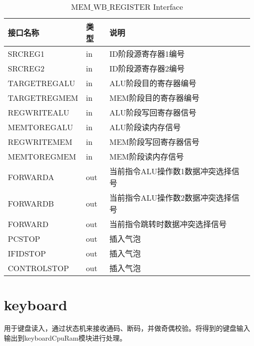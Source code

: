 \begin{table}[H]
\begin{center}
\renewcommand{\arraystretch}{1.3}
\small
\caption{MEM$\_$WB$\_$REGISTER Interface}
\label{tab:treatments}
\begin{tabular}{|p{3cm}<{\centering}|p{1.4cm}<{\centering}|p{7cm}<{\centering}|}
\hline
接口名称 & 类型 & 说明 \\
\hline
SRCREG1 & in & ID阶段源寄存器1编号 \\
\hline
SRCREG2 & in & ID阶段源寄存器2编号 \\
\hline
TARGETREGALU & in & ALU阶段目的寄存器编号 \\
\hline
TARGETREGMEM & in & MEM阶段目的寄存器编号 \\
\hline
REGWRITEALU & in & ALU阶段写回寄存器信号 \\
\hline
MEMTOREGALU & in & ALU阶段读内存信号 \\
\hline
REGWRITEMEM & in & MEM阶段写回寄存器信号 \\
\hline
MEMTOREGMEM & in & MEM阶段读内存信号 \\
\hline
FORWARDA & out & 当前指令ALU操作数1数据冲突选择信号 \\
\hline
FORWARDB & out & 当前指令ALU操作数2数据冲突选择信号\\
\hline
FORWARD & out & 当前指令跳转时数据冲突选择信号\\
\hline
PCSTOP & out & 插入气泡\\
\hline
IFIDSTOP & out & 插入气泡\\
\hline
CONTROLSTOP & out & 插入气泡\\
\hline
\end{tabular}
\end{center}
\end{table}


\section{keyboard}

用于键盘读入，通过状态机来接收通码、断码，并做奇偶校验。将得到的键盘输入输出到keyboardCpuRam模块进行处理。

